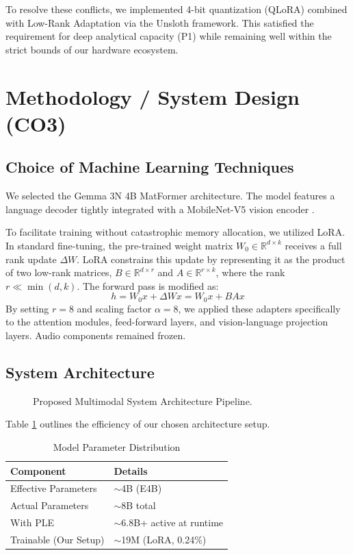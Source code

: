 \documentclass[12pt, a4paper]{article}
\begin{document}
To resolve these conflicts, we implemented 4-bit quantization (QLoRA) \cite{dettmers2023qlora} combined with Low-Rank Adaptation \cite{hu2021lora} via the Unsloth framework. This satisfied the requirement for deep analytical capacity (P1) while remaining well within the strict bounds of our hardware ecosystem.

\section{Methodology / System Design (CO3)}

\subsection{Choice of Machine Learning Techniques}
We selected the Gemma 3N 4B MatFormer architecture. The model features a language decoder tightly integrated with a MobileNet-V5 vision encoder \cite{howard2019searching}.

To facilitate training without catastrophic memory allocation, we utilized LoRA. In standard fine-tuning, the pre-trained weight matrix $W_0 \in \mathbb{R}^{d \times k}$ receives a full rank update $\Delta W$. LoRA constrains this update by representing it as the product of two low-rank matrices, $B \in \mathbb{R}^{d \times r}$ and $A \in \mathbb{R}^{r \times k}$, where the rank $r \ll \min(d, k)$. The forward pass is modified as:
\begin{equation}
  h = W_0 x + \Delta W x = W_0 x + B A x
\end{equation}
By setting $r=8$ and scaling factor $\alpha=8$, we applied these adapters specifically to the attention modules, feed-forward layers, and vision-language projection layers. Audio components remained frozen.

\subsection{System Architecture}
\begin{figure}[H]
  \centering
  \caption{Proposed Multimodal System Architecture Pipeline.}
  \label{fig:architecture}
\end{figure}

Table \ref{tab:params} outlines the efficiency of our chosen architecture setup.

\begin{table}[H]
  \centering
  \caption{Model Parameter Distribution}
  \label{tab:params}
  \begin{tabular}{ll}
    \toprule
    \textbf{Component}    & \textbf{Details}              \\
    \midrule
    Effective Parameters  & $\sim$4B (E4B)                \\
    Actual Parameters     & $\sim$8B total                \\
    With PLE              & $\sim$6.8B+ active at runtime \\
    Trainable (Our Setup) & $\sim$19M (LoRA, 0.24\%)      \\
    \bottomrule
  \end{tabular}
\end{table}
\end{document}
